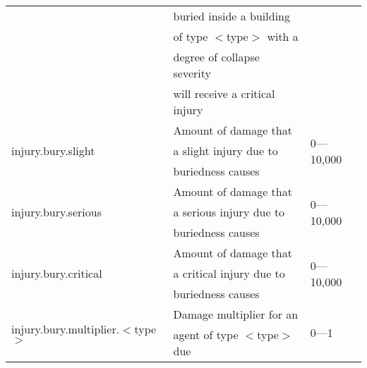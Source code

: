 \documentclass{article}
\begin{document}
\begin{table}[htb]
\begin{tabular}{lll}
                                                            & buried inside a
  building                              & \\
                                                            & of type $<$type$>$
  with a                                & \\
                                                            & degree of collapse
  severity                              & \\
                                                            & will receive a
  critical injury                       & \\
  \hline
  \multirow{3}{*}{injury.bury.slight}                       & Amount of damage
  that                                  & \multirow{3}{*}{0---10,000}\\
                                                            & a slight injury
  due to                                & \\
                                                            & buriedness causes 
                                        & \\
  \hline
  \multirow{3}{*}{injury.bury.serious}                      & Amount of damage
  that                                  & \multirow{3}{*}{0---10,000}\\
                                                            & a serious injury
  due to                                & \\
                                                            & buriedness causes 
                                        & \\
  \hline
  \multirow{3}{*}{injury.bury.critical}                     & Amount of damage
  that                                  & \multirow{3}{*}{0---10,000}\\
                                                            & a critical injury
  due to                                & \\
                                                            & buriedness causes 
                                        & \\
  \hline
  \multirow{3}{*}{injury.bury.multiplier.$<$type$>$}        & Damage multiplier
  for an                                & \multirow{3}{*}{0---1}\\
                                                            & agent of type
  $<$type$>$ due                        & \\

\end{tabular}
\end{table}
\end{document}
